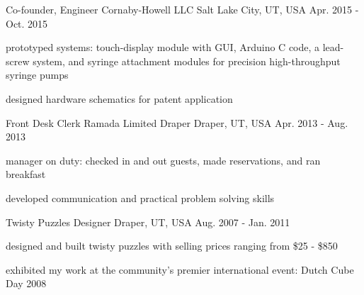 \begin{cventries}
  \cventry
    {Co-founder, Engineer} %
    {Cornaby-Howell LLC} %
    {Salt Lake City, UT, USA} %
    {Apr. 2015 - Oct. 2015} %
    {
      \begin{cvitems} %
        \item {prototyped systems: touch-display module with GUI, Arduino C code, a lead-screw system, and syringe attachment modules for precision high-throughput syringe pumps}
        \item {designed hardware schematics for patent application}
      \end{cvitems}
    }
    
  \cventry
    {Front Desk Clerk} %
    {Ramada Limited Draper} %
    {Draper, UT, USA} %
    {Apr. 2013 - Aug. 2013} %
    {
      \begin{cvitems} %
        \item {manager on duty: checked in and out guests, made reservations, and ran breakfast}
        \item {developed communication and practical problem solving skills}
      \end{cvitems}
    }
    
  \cventry
    {Twisty Puzzles} %
    {Designer} %
    {Draper, UT, USA} %
    {Aug. 2007 - Jan. 2011} %
    {
      \begin{cvitems} %
        \item {designed and built twisty puzzles with selling prices ranging from \$25 - \$850}
        \item {exhibited my work at the community’s premier international event: Dutch Cube Day 2008}
      \end{cvitems}
    }
\end{cventries}
